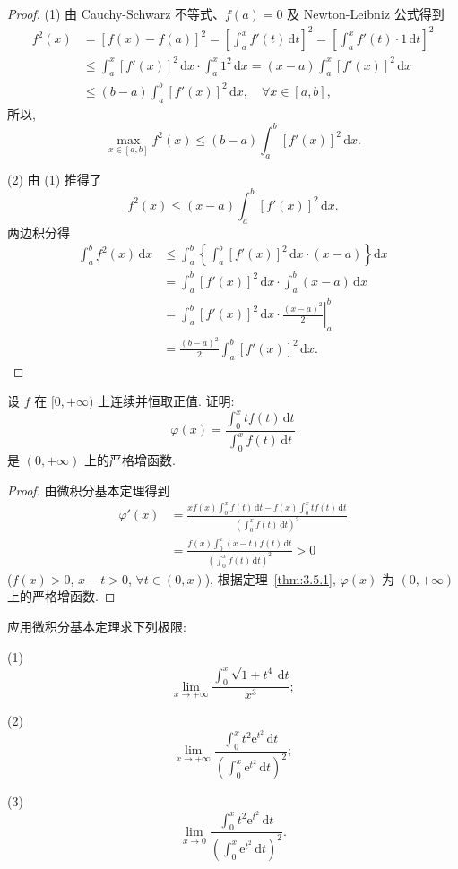\begin{proof}
(1) 由 Cauchy-Schwarz 不等式、$f(a)=0$ 及 Newton-Leibniz 公式得到
\[
\begin{aligned}
f^{2}(x)&=[f(x)-f(a)]^{2}=\left[\int_{a}^{x}f'(t)\,\mathrm{d}t\right]^{2}=\left[\int_{a}^{x}f'(t)\cdot 1\,\mathrm{d}t\right]^{2}\\
&\leqslant\int_{a}^{x}[f'(x)]^{2}\,\mathrm{d}x\cdot\int_{a}^{x}1^{2}\,\mathrm{d}x=(x-a)\int_{a}^{x}[f'(x)]^{2}\,\mathrm{d}x\\
&\leqslant(b-a)\int_{a}^{b}[f'(x)]^{2}\,\mathrm{d}x,\quad\forall x\in[a,b],
\end{aligned}
\]
所以,
\[
\max_{x\in[a,b]}f^{2}(x)\leqslant(b-a)\int_{a}^{b}[f'(x)]^{2}\,\mathrm{d}x.
\]

(2) 由 (1) 推得了
\[
f^{2}(x)\leqslant(x-a)\int_{a}^{b}[f'(x)]^{2}\,\mathrm{d}x.
\]
两边积分得
\[
\begin{aligned}
\int_{a}^{b}f^{2}(x)\,\mathrm{d}x&\leqslant\int_{a}^{b}\left\{\int_{a}^{b}[f'(x)]^{2}\,\mathrm{d}x\cdot(x-a)\right\}\mathrm{d}x\\
&=\int_{a}^{b}[f'(x)]^{2}\,\mathrm{d}x\cdot\int_{a}^{b}(x-a)\,\mathrm{d}x\\
&=\int_{a}^{b}[f'(x)]^{2}\,\mathrm{d}x\cdot\left.\frac{(x-a)^{2}}{2}\right|_{a}^{b}\\
&=\frac{(b-a)^{2}}{2}\int_{a}^{b}[f'(x)]^{2}\,\mathrm{d}x.
\end{aligned}
\]
\end{proof}

\begin{example}\label{ex:6.3.6}
设 $f$ 在 $[0,+\infty)$ 上连续并恒取正值. 证明:
\[
\varphi(x)=\frac{\int_{0}^{x}tf(t)\,\mathrm{d}t}{\int_{0}^{x}f(t)\,\mathrm{d}t}
\]
是 $(0,+\infty)$ 上的严格增函数.
\end{example}

\begin{proof}
由微积分基本定理得到
\[
\begin{aligned}
\varphi'(x)&=\frac{xf(x)\int_{0}^{x}f(t)\,\mathrm{d}t-f(x)\int_{0}^{x}tf(t)\,\mathrm{d}t}{\left(\int_{0}^{x}f(t)\,\mathrm{d}t\right)^{2}}\\
&=\frac{f(x)\int_{0}^{x}(x-t)f(t)\,\mathrm{d}t}{\left(\int_{0}^{x}f(t)\,\mathrm{d}t\right)^{2}}>0
\end{aligned}
\]
($f(x)>0$, $x-t>0$, $\forall t\in(0,x)$), 根据定理~\ref{thm:3.5.1}, $\varphi(x)$ 为 $(0,+\infty)$ 上的严格增函数.
\end{proof}

\begin{example}\label{ex:6.3.7}
应用微积分基本定理求下列极限:

(1)
\[
\lim_{x\to+\infty}\frac{\int_{0}^{x}\sqrt{1+t^{4}}\,\mathrm{d}t}{x^{3}};
\]

(2)
\[
\lim_{x\to+\infty}\frac{\int_{0}^{x}t^{2}\mathrm{e}^{t^{2}}\,\mathrm{d}t}{\left(\int_{0}^{x}\mathrm{e}^{t^{2}}\,\mathrm{d}t\right)^{2}};
\]

(3)
\[
\lim_{x\to 0}\frac{\int_{0}^{x}t^{2}\mathrm{e}^{t^{2}}\,\mathrm{d}t}{\left(\int_{0}^{x}\mathrm{e}^{t^{2}}\,\mathrm{d}t\right)^{2}}.
\]
\end{example}

